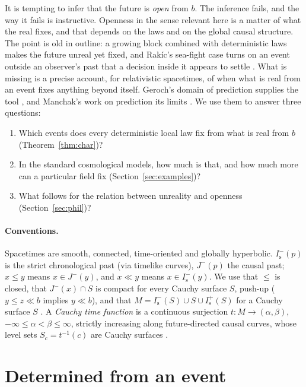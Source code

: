 \documentclass[11pt]{article}
\theoremstyle{definition}
\newcommand{\Is}{I^-_{\mathrm s}}
\newcommand{\Isp}{I^+_{\mathrm s}}
\begin{document}
It is tempting to infer that the future is \emph{open} from $b$. The
inference fails, and the way it fails is instructive. Openness in the sense
relevant here is a matter of what the real fixes, and that depends on the
laws and on the global causal structure. The point is old in outline: a
growing block \citep{Broad1923} combined with deterministic laws makes the
future unreal yet fixed, and Rak\'ic's sea-fight case turns on an event
outside an observer's past that a decision inside it appears to settle
\citep{Rakic1997}. What is missing is a precise account, for relativistic
spacetimes, of when what is real from an event fixes anything beyond itself.
Geroch's domain of prediction supplies the tool \citep{Geroch1977}, and
Manchak's work on prediction its limits \citep{Manchak2008}. We use them to
answer three questions:
\begin{enumerate}
\item Which events does every deterministic local law fix from what is real
from $b$ (Theorem~\ref{thm:char})?
\item In the standard cosmological models, how much is that, and how much
more can a particular field fix (Section~\ref{sec:examples})?
\item What follows for the relation between unreality and openness
(Section~\ref{sec:phil})?
\end{enumerate}

\paragraph{Conventions.} Spacetimes are smooth, connected, time-oriented and
globally hyperbolic. $\Is(p)$ is the strict chronological past (via timelike
curves), $J^-(p)$ the causal past; $x\le y$ means $x\in J^-(y)$, and $x\ll y$
means $x\in\Is(y)$. We use that $\le$ is closed, that $J^-(x)\cap S$ is
compact for every Cauchy surface $S$, push-up ($y\le z\ll b$ implies $y\ll b$),
and that $M=\Is(S)\cup S\cup\Isp(S)$ for a Cauchy surface $S$ \citep{MS2008}.
A \emph{Cauchy time function} is a continuous surjection $t:M\to(\alpha,\beta)$,
$-\infty\le\alpha<\beta\le\infty$, strictly increasing along future-directed
causal curves, whose level sets $S_c=t^{-1}(c)$ are Cauchy surfaces
\citep{BS2005}.

\section{Determined from an event}\label{sec:det}
\end{document}
